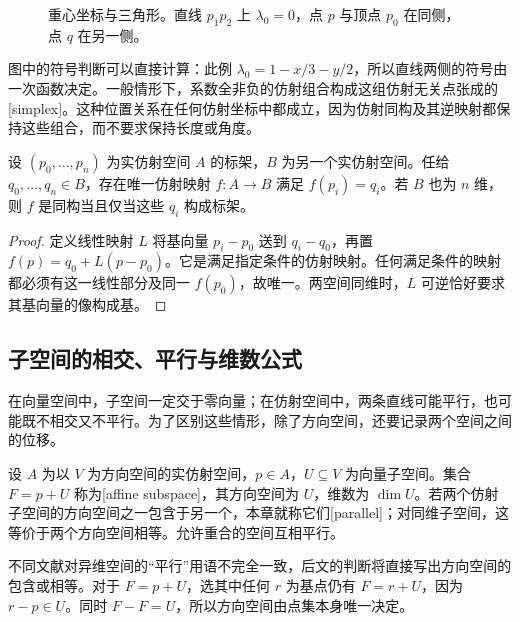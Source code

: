 \begin{figure}[htbp]
	\centering
	
	\caption[重心坐标与三角形]{重心坐标与三角形。直线 \(p_1p_2\) 上 \(\lambda_0=0\)，点 \(p\) 与顶点 \(p_0\) 在同侧，点 \(q\) 在另一侧。}
	\label{g1:fig:barycentric}
\end{figure}

图中的符号判断可以直接计算：此例 \(\lambda_0=1-x/3-y/2\)，所以直线两侧的符号由一次函数决定。一般情形下，系数全非负的仿射组合构成这组仿射无关点张成的[simplex]。这种位置关系在任何仿射坐标中都成立，因为仿射同构及其逆映射都保持这些组合，而不要求保持长度或角度。

\begin{proposition}\label{g1:prop:frame-map}
	设 \((p_0,\ldots,p_n)\) 为实仿射空间 \(A\) 的标架，\(B\) 为另一个实仿射空间。任给 \(q_0,\ldots,q_n\in B\)，存在唯一仿射映射 \(f:A\rightarrow B\) 满足 \(f(p_i)=q_i\)。若 \(B\) 也为 \(n\) 维，则 \(f\) 是同构当且仅当这些 \(q_i\) 构成标架。
\end{proposition}
\begin{proof}
	定义线性映射 \(L\) 将基向量 \(p_i-p_0\) 送到 \(q_i-q_0\)，再置 \(f(p)=q_0+L(p-p_0)\)。它是满足指定条件的仿射映射。任何满足条件的映射都必须有这一线性部分及同一 \(f(p_0)\)，故唯一。两空间同维时，\(L\) 可逆恰好要求其基向量的像构成基。
\end{proof}

\subsection{子空间的相交、平行与维数公式}
\label{g1:subsec:0101:03}

在向量空间中，子空间一定交于零向量；在仿射空间中，两条直线可能平行，也可能既不相交又不平行。为了区别这些情形，除了方向空间，还要记录两个空间之间的位移。

\begin{definition}\label{g1:def:affine-subspace}
	设 \(A\) 为以 \(V\) 为方向空间的实仿射空间，\(p\in A\)，\(U\subseteq V\) 为向量子空间。集合 \(F=p+U\) 称为[affine subspace]，其方向空间为 \(U\)，维数为 \(\dim U\)。若两个仿射子空间的方向空间之一包含于另一个，本章就称它们[parallel]；对同维子空间，这等价于两个方向空间相等。允许重合的空间互相平行。
\end{definition}

不同文献对异维空间的“平行”用语不完全一致，后文的判断将直接写出方向空间的包含或相等。对于 \(F=p+U\)，选其中任何 \(r\) 为基点仍有 \(F=r+U\)，因为 \(r-p\in U\)。同时 \(F-F=U\)，所以方向空间由点集本身唯一决定。


